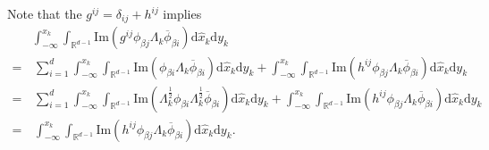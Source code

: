 \documentclass[10pt,twoside,a4paper]{article}
\numberwithin{equation}{section}\allowdisplaybreaks
\begin{document}
Note that the $g^{ij}=\delta_{ij}+h^{ij}  $  implies
\begin{align*}
	&\int_{-\infty}^{x_k} \int_{\mathbb{R}^{d-1}}   \mathrm{Im} \left(  g^{ij} \phi_{\beta j}\Lambda_k\overline{\phi}_{\beta i}\right)\mathrm{d} \hat{x}_k \mathrm{d} y_k\nonumber\\
	=&\, \sum_{i=1}^d \int_{-\infty}^{x_k} \int_{\mathbb{R}^{d-1}}   \mathrm{Im} \left(   \phi_{\beta i}\Lambda_k\overline{\phi}_{\beta i}\right)\mathrm{d} \hat{x}_k \mathrm{d} y_k+\int_{-\infty}^{x_k} \int_{\mathbb{R}^{d-1}}   \mathrm{Im} \left(  h^{ij} \phi_{\beta j}\Lambda_k\overline{\phi}_{\beta i}\right)\mathrm{d} \hat{x}_k \mathrm{d} y_k\nonumber\\
	=&\, \sum_{i=1}^d  \int_{-\infty}^{x_k} \int_{\mathbb{R}^{d-1}}   \mathrm{Im} \left(   \Lambda_k^{\frac12}\phi_{\beta i}\Lambda_k^{\frac12}\overline{\phi}_{\beta i}\right)\mathrm{d} \hat{x}_k \mathrm{d} y_k+\int_{-\infty}^{x_k} \int_{\mathbb{R}^{d-1}}   \mathrm{Im} \left(  h^{ij} \phi_{\beta j}\Lambda_k\overline{\phi}_{\beta i}\right)\mathrm{d} \hat{x}_k \mathrm{d} y_k\nonumber\\
	=&\,\int_{-\infty}^{x_k} \int_{\mathbb{R}^{d-1}}   \mathrm{Im} \left(  h^{ij} \phi_{\beta j}\Lambda_k\overline{\phi}_{\beta i}\right)\mathrm{d} \hat{x}_k \mathrm{d} y_k.
\end{align*}
\end{document}
